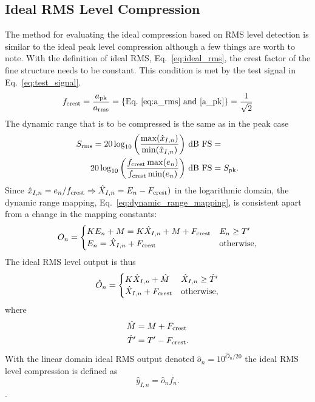 \documentclass[../main2.tex]{subfiles}
\begin{document}
\FloatBarrier
\subsection{Ideal RMS Level Compression}\label{method_ideal_rms_compression}
The method for evaluating the ideal compression based on RMS level detection is similar to the ideal peak level compression although a few things are worth to note.
With the definition of ideal RMS, Eq.~\eqref{eq:ideal_rms}, the crest factor of the fine structure needs to be constant. This condition is met by the test signal in Eq.~\eqref{eq:test_signal}.
\begin{align}
f_\text{crest} = \frac{a_\text{pk}}{a_\text{rms}} = \left\{\text{Eq.~\eqref{eq:a_rms} and \eqref{a_pk}}\right\} = \frac{1}{\sqrt{2}}
\end{align}
The dynamic range that is to be compressed is the same as in the peak case
\begin{equation}
\begin{split}
S_\text{rms} = 20 \log_{10} \left(\frac{\max(\hat{x}_{I,n})}{\min(\hat{x}_{I,n})}\right) \mskip3mu\text{dB FS} &= \\ 
20 \log_{10} \left(\frac{f_\text{crest}\max(e_n)}{f_\text{crest}\min(e_n)}\right) \mskip3mu\text{dB FS} &= S_\text{pk}.
\end{split}
\end{equation}
Since $\hat{x}_{I,n} = e_n/f_\text{crest} \Rightarrow \hat{X}_{I,n} = E_n - F_\text{crest})$ in the logarithmic domain,  the dynamic range mapping, Eq.~\eqref{eq:dynamic_range_mapping}, is consistent apart from a change in the mapping constants: 
\begin{equation}
O_n =
\begin{cases}
	K E_n + M = K\hat{X}_{I,n} + M + F_\text{crest}	& E_n \geq T'  \\
	E_n = \hat{X}_{I,n} + F_\text{crest}				& \text{otherwise},
\end{cases} 
\end{equation}
The ideal RMS level output is thus
\begin{equation}
\hat{O}_n =
\begin{cases}
	K\hat{X}_{I,n} + \hat{M}	& \hat{X}_{I,n} \geq \hat{T}' \\
	\hat{X}_{I,n} + F_\text{crest}				& \text{otherwise},
\end{cases} 
\end{equation}
where
\begin{align}
\hat{M} &= M + F_\text{crest} \\
\hat{T}' &=T' - F_\text{crest}.
\end{align}
With the linear domain ideal RMS output denoted $\hat{o}_n = 10^{\hat{O}_n/20}$ the ideal RMS level compression is defined as
\begin{equation}\label{eq:ideal_rms_output}
\hat{y}_{I,n} = \hat{o}_n f_n.
\end{equation}.
\end{document}
